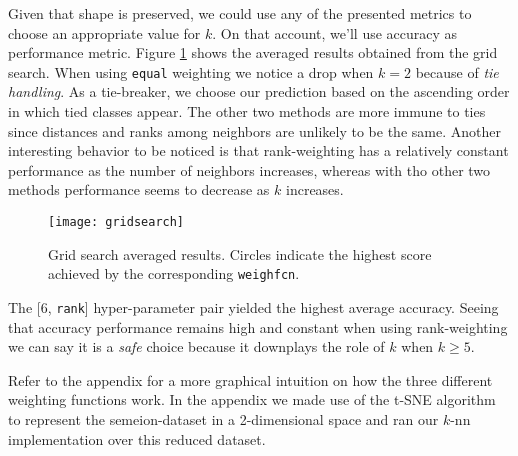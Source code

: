 Given that shape is preserved, we could use any of the presented metrics to choose an appropriate value for $k$. On that account, we'll use accuracy as performance metric. Figure \ref{fig:gridsearch} shows the averaged results obtained from the grid search. When using \texttt{equal} weighting we notice a drop when $k=2$ because of \textit{tie handling}. As a tie-breaker, we choose our prediction based on the ascending order in which tied classes appear. The other two methods are more immune to ties since distances and ranks among neighbors are unlikely to be the same. Another interesting behavior to be noticed is that rank-weighting has a relatively constant performance as the number of neighbors increases, whereas with tho other two methods performance seems to decrease as $k$ increases.
\begin{figure}[]
	\centering
	\texttt{[image: gridsearch]}
	\caption{Grid search averaged results. Circles indicate the highest score achieved by the corresponding \texttt{weighfcn}.}
	\label{fig:gridsearch}
\end{figure}

The [6, \texttt{rank}] hyper-parameter pair yielded the highest average accuracy. Seeing that accuracy performance remains high and constant when using rank-weighting we can say it is a \textit{safe} choice because it downplays the role of $k$ when $k \geq 5$.

Refer to the appendix for a more graphical intuition on how the three different weighting functions work. In the appendix we made use of the t-SNE algorithm to represent the semeion-dataset in a 2-dimensional space and ran our $k$-nn implementation over this reduced dataset.
